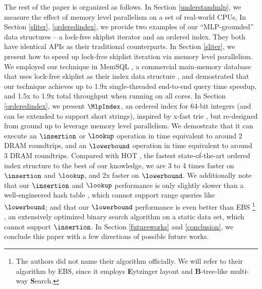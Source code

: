 \documentclass[11pt, usletter]{article}
\begin{document}
The rest of the paper is organized as follows. 
In Section \ref{understandmlp}, we measure the effect of memory level parallelism on a set of real-world CPUs, 
In Section \ref{sliter}, \ref{orderedindex}, 
we provide two examples of our ``MLP-grounded'' data structures -- a lock-free skiplist iterator and an ordered index. 
They both have identical APIs as their traditional counterparts.
In Section \ref{sliter}, we present how to speed up lock-free skiplist iteration via memory level parallelism. 
We employed our technique in MemSQL \cite{memsql},
a commercial main-memory database that uses lock-free skiplist \cite{lockfree_skiplist} as their index data structure \cite{memsqladamblog}, 
and demostrated that our technique achieves up to 1.9x single-threaded end-to-end query time speedup, and 1.5x to 1.9x
total throughput when running on all cores.
In Section \ref{orderedindex}, we present $\MlpIndex$, an ordered index for 64-bit integers 
(and can be extended to support short strings), 
inspired by x-fast trie \cite{xfast}, but re-designed from ground up to leverage memory level parallelism. 
We demostrate that it can execute an $\insertion$ or $\lookup$ operation in time equivalent to around 2 DRAM roundtrips, 
and an $\lowerbound$ operation in time equivalent to around 3 DRAM roundtrips. 
Compared with HOT \cite{hot_sigmod18}, the fastest state-of-the-art ordered index structure to the best of our knowledge, 
we are 3 to 4 times faster on $\insertion$ and $\lookup$, and 2x faster on $\lowerbound$.
We additionally note that our $\insertion$ and $\lookup$ performance is only slightly slower than a well-engineered hash table \cite{densehashset}, 
which cannot support range queries like $\lowerbound$;
and that our $\lowerbound$ performance is even better than EBS \footnote{The authors did not name their algorithm officially.
We will refer to their algorithm by EBS, since it employs \textbf{E}ytzinger layout and \textbf{B}-tree-like multi-way \textbf{S}earch.} \cite{binary_search_layout}, 
an extensively optimized binary search algorithm on a static data set, which cannot support $\insertion$.
In Section \ref{futureworks} and \ref{conclusion}, we conclude this paper with a few directions of possible future works.
\end{document}
